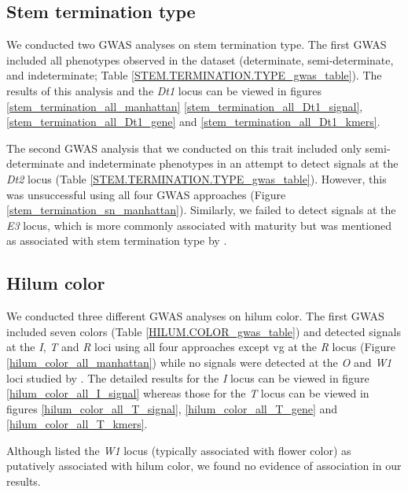 \subsection*{Stem termination type}
\label{sv-gwas-stem-termination}

We conducted two GWAS analyses on stem termination type. The first GWAS
included all phenotypes observed in the dataset (determinate, semi-determinate,
and indeterminate; Table \ref{STEM.TERMINATION.TYPE_gwas_table}). The results
of this analysis and the \textit{Dt1} locus can be viewed in figures \ref{stem_termination_all_manhattan}
\ref{stem_termination_all_Dt1_signal}, \ref{stem_termination_all_Dt1_gene} and
\ref{stem_termination_all_Dt1_kmers}.

The second GWAS analysis that we conducted on this trait included only
semi-determinate and indeterminate phenotypes in an attempt to detect signals
at the \emph{Dt2} locus (Table \ref{STEM.TERMINATION.TYPE_gwas_table}).
However, this was unsuccessful using all four GWAS
approaches (Figure \ref{stem_termination_sn_manhattan}). Similarly, we failed to
detect signals at the \textit{E3} locus, which is more commonly associated
with maturity but was mentioned as associated with stem termination type by
\cite{bandillo2017}.

\subsection*{Hilum color}
\label{sv-gwas-hilum-color}

We conducted three different GWAS analyses on hilum color. The first GWAS
included seven colors (Table \ref{HILUM.COLOR_gwas_table}) and detected signals
at the \emph{I}, \emph{T} and \emph{R} loci using all four approaches except vg
at the \emph{R} locus (Figure \ref{hilum_color_all_manhattan}) while no signals
were detected at the \emph{O} and \emph{W1} loci studied by
\cite{bandillo2017}. The detailed results for the \textit{I} locus can be viewed
in figure \ref{hilum_color_all_I_signal} whereas those for the \textit{T} locus
can be viewed in figures \ref{hilum_color_all_T_signal}, \ref{hilum_color_all_T_gene}
and \ref{hilum_color_all_T_kmers}.

Although \cite{bandillo2017} listed the \textit{W1} locus (typically associated
with flower color) as putatively associated with hilum color, we found no
evidence of association in our results.

